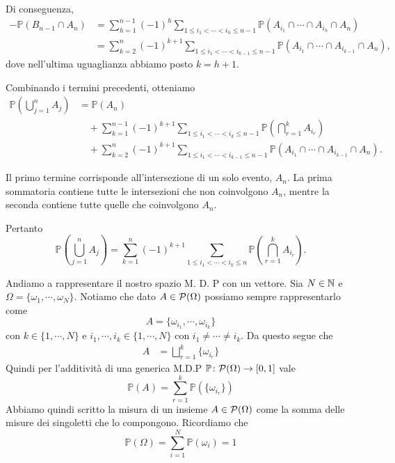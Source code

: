 \documentclass[a4paper]{article}
\begin{document}
\begin{snippetproof}{}
    Di conseguenza,
    \begin{align*}
        -\mathbb{P}(B_{n-1} \cap A_n)
        &=
        \sum_{h=1}^{n-1}
        (-1)^h
        \sum_{1 \leq i_1 < \cdots < i_h \leq n-1}
        \mathbb{P}\left(
            A_{i_1}
            \cap \cdots \cap
            A_{i_h}
            \cap A_n
        \right)
        \\
        &=
        \sum_{k=2}^{n}
        (-1)^{k+1}
        \sum_{1 \leq i_1 < \cdots < i_{k-1} \leq n-1}
        \mathbb{P}\left(
            A_{i_1}
            \cap \cdots \cap
            A_{i_{k-1}}
            \cap A_n
        \right),
    \end{align*}
    dove nell'ultima uguaglianza abbiamo posto \(k=h+1\).

    Combinando i termini precedenti, otteniamo
    \begin{align*}
        \mathbb{P}\left(
            \bigcup_{j=1}^{n} A_j
        \right)
        &=
        \mathbb{P}(A_n)
        \\
        &\quad+
        \sum_{k=1}^{n-1}
        (-1)^{k+1}
        \sum_{1 \leq i_1 < \cdots < i_k \leq n-1}
        \mathbb{P}\left(
            \bigcap_{r=1}^{k} A_{i_r}
        \right)
        \\
        &\quad+
        \sum_{k=2}^{n}
        (-1)^{k+1}
        \sum_{1 \leq i_1 < \cdots < i_{k-1} \leq n-1}
        \mathbb{P}\left(
            A_{i_1}
            \cap \cdots \cap
            A_{i_{k-1}}
            \cap A_n
        \right).
    \end{align*}

    Il primo termine corrisponde all'intersezione di un solo evento,
    \(A_n\). La prima sommatoria contiene tutte le intersezioni che
    non coinvolgono \(A_n\), mentre la seconda contiene tutte quelle
    che coinvolgono \(A_n\).

    Pertanto
    \[
        \mathbb{P}\left(
            \bigcup_{j=1}^{n} A_j
        \right)
        =
        \sum_{k=1}^{n}
        (-1)^{k+1}
        \sum_{1 \leq i_1 < \cdots < i_k \leq n}
        \mathbb{P}\left(
            \bigcap_{r=1}^{k} A_{i_r}
        \right).
    \]
\end{snippetproof}

Andiamo a rappresentare il nostro spazio M. D. P con un vettore.
Sia \(N \in \mathbb{N}\) e \(\Omega = \{\omega_1, \cdots, \omega_N\}\).
Notiamo che dato \(A \in \mathcal P (\Omega)\) possiamo sempre rappresentarlo come
\[
    A = \{\omega_{i_1}, \cdots, \omega_{i_k}\}
\]
con \(k \in \{1, \cdots, N\}\) e \(i_1, \cdots, i_k \in \{1, \cdots, N\}\)
con \(i_1 \neq \cdots \neq i_k\).
Da questo segue che
\begin{align*}
    A &= \bigsqcup_{r=1}^k \{\omega_{i_r}\}
\end{align*}
Quindi per l'additività di una generica M.D.P \(\mathbb P \colon \mathcal P (\Omega) \to [0,1]\)
vale
\[
    \mathbb P (A) = \sum_{r=1}^k \mathbb P(\{\omega_{i_r}\})
\]
Abbiamo quindi scritto la misura di un insieme \(A \in \mathcal P (\Omega)\)
come la somma delle misure dei singoletti che lo compongono.
Ricordiamo che
\[
    \mathbb P (\Omega) = \sum_{i=1}^N \mathbb P(\omega_i) = 1
\]
\end{document}
